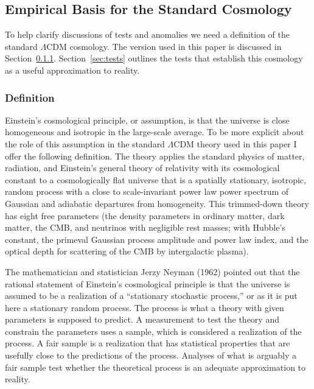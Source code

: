 \documentclass[fleqn,usenatbib]{mnras}
\begin{document}
\subsection{Empirical Basis for the Standard Cosmology}\label{sec:EmpiricalBasis}

To help clarify discussions of tests and anomalies we need a definition of the standard $\Lambda$CDM cosmology. The version used in this paper is discussed in Section~\ref{sec:definition}. Section~\ref{sec:tests} outlines the tests that establish this cosmology as a useful approximation to reality.

\subsubsection{Definition}\label{sec:definition}

Einstein's cosmological principle, or assumption, is that the universe is close homogeneous and isotropic in the large-scale average.  To be more explicit about the role of this assumption in the standard $\Lambda$CDM theory used in this paper I offer the following definition. The theory applies the standard physics of matter, radiation, and Einstein's general theory of relativity with its cosmological constant to a cosmologically flat universe that is a spatially stationary, isotropic,  random process with a close to scale-invariant power law power spectrum of  Gaussian and adiabatic departures from homogeneity.  This trimmed-down theory has eight free parameters (the density parameters in ordinary matter, dark matter, the CMB, and neutrinos with negligible rest masses; with  Hubble's constant, the primeval Gaussian process amplitude and power law index, and the optical depth for scattering of the CMB by intergalactic plasma). 

The mathematician and statistician Jerzy Neyman (1962) pointed out that the rational statement of Einstein's cosmological principle is that the universe is assumed to be a realization of a ``stationary stochastic process,'' or as it is put here a stationary random process. The process is what a theory with given parameters is supposed to predict. A measurement to test the theory and constrain the parameters uses a sample, which is considered a realization of the process. A fair sample is a realization that has statistical properties that are usefully close to the predictions of the process. Analyses of what is arguably a fair sample test whether the theoretical process is an adequate approximation to reality. 
\end{document}
